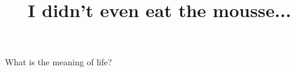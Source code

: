 \documentclass[hidesidemenu]{webquiz}
\title{I didn't even eat the mousse...}
\begin{document}
  \begin{question}
    What is the meaning of life?
  \end{question}
\end{document}
